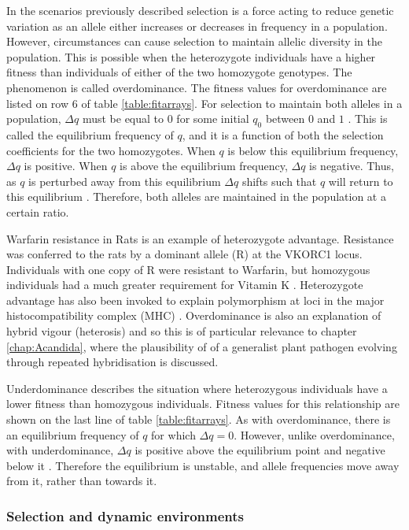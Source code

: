 In the scenarios previously described selection is a force acting to reduce genetic variation as an allele either increases or decreases in frequency in a population.
However, circumstances can cause selection to maintain allelic diversity in the population.
This is possible when the heterozygote individuals have a higher fitness than individuals of either of the two homozygote genotypes.
The phenomenon is called overdominance.
The fitness values for overdominance are listed on row 6 of table \ref{table:fitarrays}.
For selection to maintain both alleles in a population, $\Delta q$ must be equal to $0$ for some initial $q_0$ between $0$ and $1$ \parencite{Charlesworth2010}.
This is called the equilibrium frequency of $q$, and it is a function of both the selection coefficients for the two homozygotes.
When $q$ is below this equilibrium frequency, $\Delta q$ is positive.
When $q$ is above the equilibrium frequency, $\Delta q$ is negative.
Thus, as $q$ is perturbed away from this equilibrium $\Delta q$ shifts such that $q$ will return to this equilibrium \parencite{Hedrick2010}.
Therefore, both alleles are maintained in the population at a certain ratio.

Warfarin resistance in Rats is an example of heterozygote advantage.
Resistance was conferred to the rats by a dominant allele (R) at the VKORC1 locus. 
Individuals with one copy of R were resistant to Warfarin, but homozygous individuals had a much greater requirement for Vitamin K \parencite{Greaves1977}.
Heterozygote advantage has also been invoked to explain polymorphism at loci in the major histocompatibility complex (MHC) \parencite{Spurgin2010}.
Overdominance is also an explanation of hybrid vigour (heterosis) \parencite{Baranwal2012} and so this is of particular relevance to chapter \ref{chap:Acandida}, where the plausibility of of a generalist plant pathogen evolving through repeated hybridisation is discussed.

Underdominance describes the situation where heterozygous individuals have a lower fitness than homozygous individuals.
Fitness values for this relationship are shown on the last line of table \ref{table:fitarrays}. 
As with overdominance, there is an equilibrium frequency of $q$ for which $\Delta q = 0$. 
However, unlike overdominance, with underdominance, $\Delta q$ is positive above the equilibrium point and negative below it \parencite{Hedrick2010}.
Therefore the equilibrium is unstable, and allele frequencies move away from it, rather than towards it.

\subsubsection{Selection and dynamic environments}

